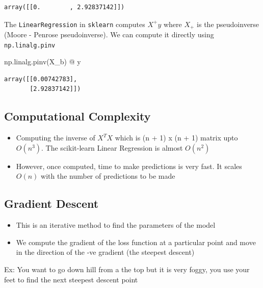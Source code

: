 \documentclass[
]{report}
\newenvironment{Shaded}{\begin{snugshade}}{\end{snugshade}}
\newcommand{\NormalTok}[1]{\textcolor[rgb]{0.00,0.23,0.31}{#1}}
\newcommand{\OperatorTok}[1]{\textcolor[rgb]{0.37,0.37,0.37}{#1}}
\providecommand{\tightlist}{%
  \setlength{\itemsep}{0pt}\setlength{\parskip}{0pt}}\usepackage{longtable,booktabs,array}
\begin{document}
\begin{verbatim}
array([[0.        , 2.92837142]])
\end{verbatim}

The \texttt{LinearRegression} in \texttt{sklearn} computes \(X^{+}y\)
where \(X_{+}\) is the pseudoinverse (Moore - Penrose pseudoinverse). We
can compute it directly using \texttt{np.linalg.pinv}

\begin{Shaded}
\begin{Highlighting}[]
\NormalTok{np.linalg.pinv(X\_b) }\OperatorTok{@}\NormalTok{ y}
\end{Highlighting}
\end{Shaded}

\begin{verbatim}
array([[0.00742783],
       [2.92837142]])
\end{verbatim}

\hypertarget{computational-complexity}{%
\subsection{Computational Complexity}\label{computational-complexity}}

\begin{itemize}
\tightlist
\item
  Computing the inverse of \(X^{T}X\) which is (n + 1) x (n + 1) matrix
  upto \(O(n^{3})\). The scikit-learn Linear Regression is almost
  \(O(n^{2})\)
\item
  However, once computed, time to make predictions is very fast. It
  scales \(O(n)\) with the number of predictions to be made
\end{itemize}

\hypertarget{gradient-descent}{%
\subsection{Gradient Descent}\label{gradient-descent}}

\begin{itemize}
\tightlist
\item
  This is an iterative method to find the parameters of the model
\item
  We compute the gradient of the loss function at a particular point and
  move in the direction of the -ve gradient (the steepest descent)
\end{itemize}

Ex: You want to go down hill from a the top but it is very foggy, you
use your feet to find the next steepest descent point
\end{document}
